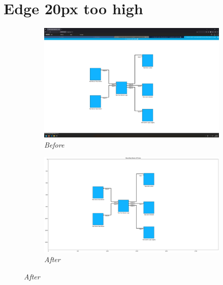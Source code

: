 \documentclass{article}
\begin{document}
\section{Edge 20px too high}
\begin{figure}[H]
    \centering
    \begin{subfigure}[t]{0.9\textwidth}
        \centering
        \includegraphics[width=\textwidth]{testcases/edge_20px_too_high/150645-838295_input_image.png}
        \caption*{\textit{Before}}
    \end{subfigure}
    \newline    
    \begin{subfigure}[t]{0.9\textwidth}
        \centering
        \includegraphics[width=\textwidth]{testcases/edge_20px_too_high/150658-463094_element_bbox_errors_labeled_colored.png}
        \caption*{\textit{After}}
    \end{subfigure}
    \label{fig:edge_too_high_20}
\end{figure}
\newpage
\end{document}
